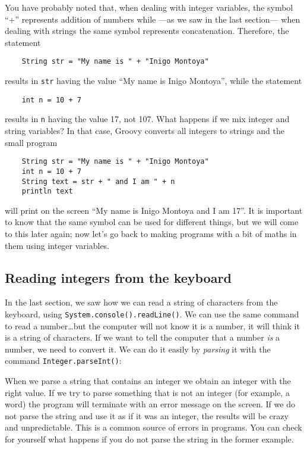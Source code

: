 You have probably noted that, when dealing with integer
variables, the symbol ``+'' represents addition of numbers while ---as
we saw in the last section--- when dealing with strings the same
symbol represents concatenation. Therefore, the statement

\begin{Verbatim}
    String str = "My name is " + "Inigo Montoya"
\end{Verbatim}

results in \verb+str+ having the value ``My name is Inigo Montoya'',
while the statement

\begin{Verbatim}
    int n = 10 + 7
\end{Verbatim}

results in \verb+n+ having the value 17, not 107. What happens if we
mix integer and string variables? In that case, Groovy converts all
integers to strings and the small program

\begin{Verbatim}
    String str = "My name is " + "Inigo Montoya"
    int n = 10 + 7
    String text = str + " and I am " + n
    println text
\end{Verbatim}

will print on the screen ``My name is Inigo Montoya and I am 17''. It
is important to know that the same symbol can be used for different
things, but we will come to this later again; now let's go back to
making programs with a bit of maths in them using integer variables.

\subsection{Reading integers from the keyboard}
\label{sec:intkeyboard}

In the last section, we saw how we can read a string of characters
from the keyboard, 
using \verb+System.console().readLine()+. We can use the same command
to read a number\ldots but the computer will not know it is a number,
it will think it is a string of characters. If we want to tell the
computer that a number \emph{is} a number, we need to convert it. We
can do it easily by \emph{parsing} it with the command
\verb+Integer.parseInt()+: 


When we parse a string that contains an integer we obtain an integer
with the right value. If we try to parse something that is not an
integer (for example, a word) the program will terminate with an error
message on the screen. If we do not parse the string and use it as if
it was an integer, the results will be crazy and unpredictable. This
is a common source of errors in programs. You can check for yourself
what happens if you do not parse the string in the former example. 

